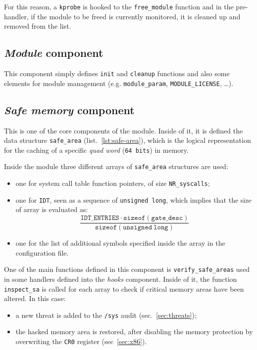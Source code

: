 \documentclass{article}
\begin{document}
	For this reason, a \texttt{kprobe} is hooked to the \texttt{free\_module} function and in the pre-handler, if the
	module to be freed is currently monitored, it is cleaned up and removed from the list.

	\subsection{\emph{Module} component}\label{sec:module}
	This component simply defines \texttt{init} and \texttt{cleanup} functions and also some elements for module
	management (e.g. \texttt{module\_param}, \texttt{MODULE\_LICENSE}, \dots).

	\subsection{\emph{Safe memory} component}\label{sec:safemem}
	This is one of the core components of the module. Inside of it, it is defined the data structure
	\texttt{safe\_area} (list.~\ref{lst:safe-area}), which is the logical representation for the caching of	a specific
	\textit{quad word} (\texttt{64 bits}) in memory.

	Inside the module three different arrays of \texttt{safe\_area} structures are used:
	\begin{itemize}
		\item one for system call table function pointers, of size \texttt{NR\_syscalls};
		\item one for \texttt{IDT}, seen as a sequence of \texttt{unsigned long}, which implies that the size of array
		is evaluated as:
		\begin{equation*}
			\dfrac{\mathtt{IDT\_ENTRIES} \cdot \mathtt{sizeof(gate\_desc)}}{\mathtt{sizeof(unsigned\ long)}}
		\end{equation*}
		\item one for the list of additional symbols specified inside the array in the configuration file.
	\end{itemize}

	One of the main functions defined in this component is \texttt{verify\_safe\_areas} used in some handlers defined
	into the \emph{hooks} component. Inside of it, the function \texttt{inspect\_sa} is called for each array to check
	if critical memory areas have been altered. In this case:

	\begin{itemize}
		\item a new threat is added to the \texttt{/sys} audit (sec.~\ref{sec:threats});
		\item the hacked memory area is restored, after disabling the memory protection by overwriting the \texttt{CR0}
		register (sec~\ref{sec:x86}).
	\end{itemize}
\end{document}
